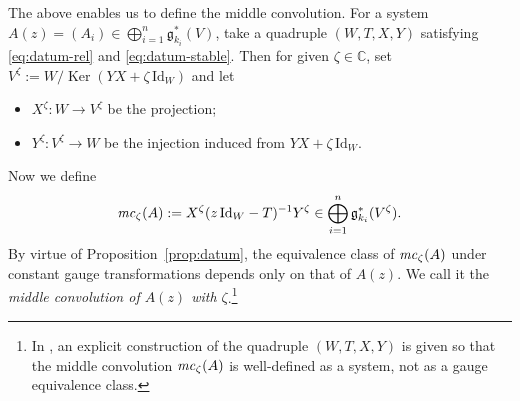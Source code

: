 \documentclass[pdftex]{sigma}
\newenvironment{itm}%
{\begin{itemize}
\setlength{\itemsep}{0em}
}%
{\end{itemize}}
\numberwithin{equation}{section}
\theoremstyle{definition}
\newcommand{\propref}[1]{Proposition~\ref{#1}}
\newcommand{\C}{\mathbb{C}} %
\newcommand{\g}{\mathfrak{g}} %
\newcommand{\Ker}{\operatorname{Ker}}
\newcommand{\unit}{\mathrm{Id}}
\newcommand{\mc}{\operatorname{\it mc}}
\begin{document}
The above enables us to def\/ine the middle convolution.
For a system
$A(z)=(A_i) \in \bigoplus_{i=1}^n \g^*_{k_i}(V)$,
take a quadruple $(W,T,X,Y)$ satisfying
\eqref{eq:datum-rel} and \eqref{eq:datum-stable}.
Then for given $\zeta \in \C$,
set $V^\zeta := W/\Ker (YX +\zeta\,\unit_W)$ and let
\begin{itm}
\item $X^\zeta \colon W \to V^\zeta$ be the projection;
\item $Y^\zeta \colon V^\zeta \to W$ be the injection induced from
$YX+\zeta\,\unit_W$.
\end{itm}
Now we def\/ine
\[
\mc_\zeta(A):= X^\zeta(z\,\unit_W - T)^{-1}Y^\zeta
\in \bigoplus_{i=1}^n \g^*_{k_i}(V^\zeta).
\]
By virtue of \propref{prop:datum},
the equivalence class of $\mc_\zeta(A)$ under constant gauge transformations
depends only on that of $A(z)$.
We call it the {\em middle convolution of $A(z)$ with $\zeta$}.\footnote{In \cite{0911.3863}, an explicit construction of
the quadruple $(W,T,X,Y)$ is given so that
the middle convolution $\mc_\zeta(A)$ is well-def\/ined as a system,
not as a gauge equivalence class.}
\end{document}
